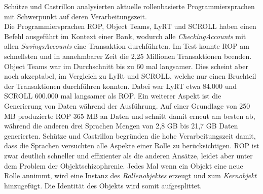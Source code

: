 \documentclass[conference]{IEEEtran}
\begin{document}
Schütze und Castrillon analysierten aktuelle rollenbasierte Programmiersprachen mit Schwerpunkt auf deren Verarbeitungszeit\cite{schutze2017analyzing}.\\ Die Programmiersprachen ROP, Object Teams, LyRT und SCROLL haben einen Befehl ausgeführt im Kontext einer Bank, wodurch alle \textit{CheckingAccounts} mit allen \textit{SavingsAccounts} eine Transaktion durchführten. Im Test konnte ROP am schnellsten und in annehmbarer Zeit die 2,25 Millionen Transaktionen beenden. Object Teams war im Durchschnitt bis zu 60 mal langsamer. Dies scheint aber noch akzeptabel, im Vergleich zu LyRt und SCROLL, welche nur einen Bruchteil der Transaktionen durchführen konnten. Dabei war LyRT etwa 84.000 und SCROLL 600.000 mal langsamer als ROP. Ein weiterer Aspekt ist die Generierung von Daten während der Ausführung. Auf einer Grundlage von 250 MB produzierte ROP 365 MB an Daten und schnitt damit erneut am besten ab, während die anderen drei Sprachen Mengen von 2,8 GB bis 21,7 GB Daten generierten. Schütze und Castrillon begründen die hohe Verarbeitungszeit damit, dass die Sprachen versuchten alle Aspekte einer Rolle zu berücksichtigen. ROP ist zwar deutlich schneller und effizienter als die anderen Ansätze, leidet aber unter dem Problem der Objektschizophrenie. Jedes Mal wenn ein Objekt eine neue Rolle annimmt, wird eine Instanz des \textit{Rollenobjektes} erzeugt und zum \textit{Kernobjekt} hinzugefügt. Die Identität des Objekts wird somit aufgesplittet.
\end{document}
